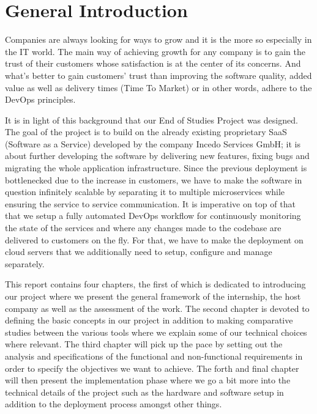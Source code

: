 \section*{General Introduction}
Companies are always looking for ways to grow and it is the more so especially in the IT world. The main way of achieving growth for any company is to gain the trust of their customers whose satisfaction is at the center of its concerns.
And what's better to gain customers' trust than improving the software quality, added value as well as delivery times (Time To Market) or in other words, adhere to the DevOps principles.

It is in light of this background that our End of Studies Project was designed. The goal of the project is to build on the already existing proprietary SaaS (Software as a Service) developed by the company Incedo Services GmbH; it is about further developing the software by delivering new features, fixing bugs and migrating the whole application infrastructure.
Since the previous deployment is bottlenecked due to the increase in customers, we have to make the software in question infinitely scalable by separating it to multiple microservices while ensuring the service to service communication.
It is imperative on top of that that we setup a fully automated DevOps workflow for continuously monitoring the state of the services and where any changes made to the codebase are delivered to customers on the fly.
For that, we have to make the deployment on cloud servers that we additionally need to setup, configure and manage separately.

This report contains four chapters, the first of which is dedicated to introducing our project where we present the general framework of the internship, the host company as well as the assessment of the work. The second chapter is devoted to defining the basic concepts in our project in addition to making comparative studies between the various tools where we explain some of our technical choices where relevant. The third chapter will pick up the pace by setting out the analysis and specifications of the functional and non-functional requirements in order to specify the objectives we want to achieve. The forth and final chapter will then present the implementation phase where we go a bit more into the technical details of the project such as the hardware and software setup in addition to the deployment process amongst other things.

\newpage

